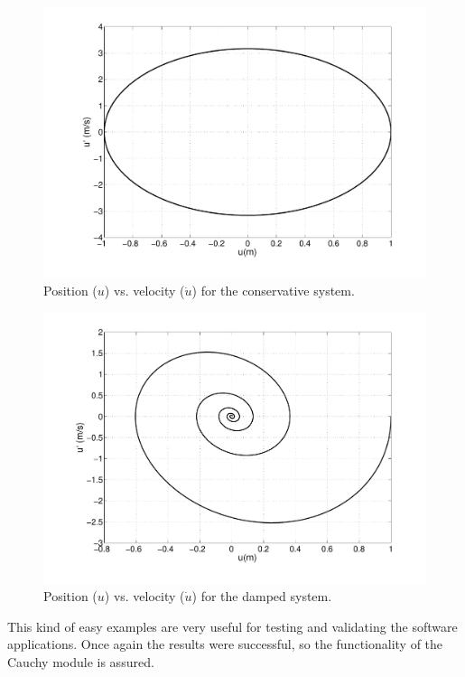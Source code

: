 \begin{multicols}{2}

\begin{figure}[H]
\centering
\includegraphics[scale=0.3, trim = 20mm 0mm 0mm 0mm, clip]{./Figures/2-CauchyProblem/D=0_uu.pdf}
\caption{Position ($u$) vs. velocity ($\dot{u}$) for the conservative system.}
\end{figure}

\columnbreak

\begin{figure}[H]
\centering
\includegraphics[scale=0.3, trim = 20mm 0mm 0mm 0mm, clip]{./Figures/2-CauchyProblem/D=1_uu.pdf}
\caption{Position ($u$) vs. velocity ($\dot{u}$) for the damped system.}
\end{figure}

\end{multicols}

This kind of easy examples are very useful for testing and validating the
software applications. Once again the results were successful, so the
functionality of the Cauchy module is assured. \\







